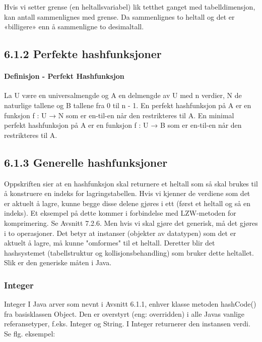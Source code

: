 \documentclass[11pt]{article}
\begin{document}
        Hvis vi setter grense (en heltallsvariabel) lik tetthet
        ganget med tabelldimensjon, kan antall sammenlignes med grense. Da sammenlignes to
        heltall og det er «billigere» enn å sammenligne to desimaltall.

    \subsection{6.1.2 Perfekte hashfunksjoner}
        \paragraph{Definisjon - Perfekt Hashfunksjon}

        La U være en universalmengde og A en delmengde av U med
        n verdier, N de naturlige tallene og B tallene fra 0 til n - 1. En perfekt
        hashfunksjon på A er en funksjon f : U → N som er en-til-en når den restrikteres
        til A. En minimal perfekt hashfunksjon på A er en funksjon f : U → B som er
        en-til-en når den restrikteres til A.

    \subsection{6.1.3 Generelle hashfunksjoner}
        Oppskriften sier at en hashfunksjon skal returnere et heltall som så skal brukes til å
        konstruere en indeks for lagringstabellen. Hvis vi kjenner de verdiene som det er aktuelt å
        lagre, kunne begge disse delene gjøres i ett (først et heltall og så en indeks). Et eksempel på
        dette kommer i forbindelse med LZW-metoden for komprimering. Se Avsnitt 7.2.6. Men hvis
        vi skal gjøre det generisk, må det gjøres i to operasjoner. Det betyr at instanser (objekter av
        datatypen) som det er aktuelt å lagre, må kunne "omformes" til et heltall. Deretter blir det
        hashsystemet (tabellstruktur og kollisjonsbehandling) som bruker dette heltallet. Slik er den
        generiske måten i Java.

        \subsubsection{Integer}
            Integer I Java arver som nevnt i Avsnitt 6.1.1, enhver klasse metoden hashCode() fra
            basisklassen Object. Den er overstyrt (eng: overridden) i alle Javas vanlige referansetyper,
            f.eks. Integer og String. I Integer returnerer den instansen verdi. Se flg. eksempel:
\end{document}
